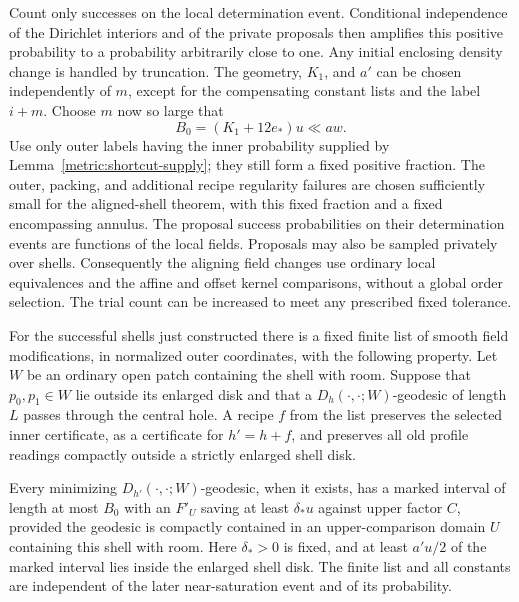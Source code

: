 Count only successes on the local determination event. Conditional
independence of the Dirichlet interiors and of the private proposals then
amplifies this positive probability to a probability arbitrarily close to
one. Any initial enclosing density change is handled by truncation. The
geometry, $K_1$, and $a'$ can be chosen independently of $m$, except for
the compensating constant lists and the label $i+m$. Choose $m$ now so
large that
\begin{equation}\label{metric:short-budget}
 B_0=(K_1+12e_*)u\ll aw.
\end{equation}
Use only outer labels having the inner probability supplied by
Lemma~\ref{metric:shortcut-supply}; they still form a fixed positive
fraction. The outer, packing, and additional recipe regularity failures
are chosen sufficiently small for the aligned-shell theorem, with this
fixed fraction and a fixed encompassing annulus. The proposal success
probabilities on their determination events are functions of the local
fields. Proposals may also be sampled privately over shells. Consequently
the aligning field changes use ordinary local equivalences and the affine
and offset kernel comparisons, without a global order selection. The trial
count can be increased to meet any prescribed fixed tolerance.

\begin{lemma}\label{metric:forcing-recipe}
For the successful shells just constructed there is a fixed finite list of
smooth field modifications, in normalized outer coordinates, with the
following property. Let $W$ be an ordinary open patch containing the shell
with room. Suppose that $p_0,p_1\in W$ lie outside its enlarged disk and
that a $D_h(\cdot,\cdot;W)$-geodesic of length $L$ passes through the central
hole. A recipe $f$ from the list preserves the selected inner certificate,
as a certificate for $h'=h+f$, and preserves all old profile readings
compactly outside a strictly enlarged shell disk.

Every minimizing $D_{h'}(\cdot,\cdot;W)$-geodesic, when it exists, has a
marked interval of length at most $B_0$ with an $F'_U$ saving at least
$\delta_*u$ against upper factor $C$, provided the geodesic is compactly
contained in an upper-comparison domain $U$ containing this shell with
room. Here $\delta_*>0$ is fixed, and at least $a'u/2$ of the marked
interval lies inside the enlarged shell disk. The finite list and all
constants are independent of the later near-saturation event and of its
probability.
\end{lemma}

